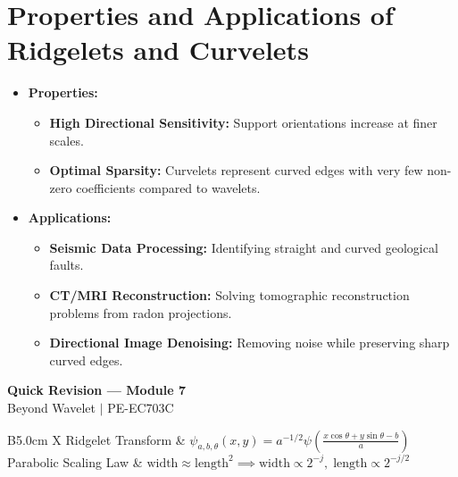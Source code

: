 \documentclass[12pt,a4paper]{article}
\renewcommand{\arraystretch}{1.45}
\begin{document}
\section{Properties and Applications of Ridgelets and Curvelets}

\begin{itemize}[leftmargin=*, itemsep=4.5pt]
  \item \textbf{Properties:} 
        \begin{itemize}[leftmargin=*, itemsep=2.5pt, topsep=2pt]
          \item \textbf{High Directional Sensitivity:} Support orientations increase at finer scales.
          \item \textbf{Optimal Sparsity:} Curvelets represent curved edges with very few non-zero coefficients compared to wavelets.
        \end{itemize}
  \item \textbf{Applications:}
        \begin{itemize}[leftmargin=*, itemsep=2.5pt, topsep=2pt]
          \item \textbf{Seismic Data Processing:} Identifying straight and curved geological faults.
          \item \textbf{CT/MRI Reconstruction:} Solving tomographic reconstruction problems from radon projections.
          \item \textbf{Directional Image Denoising:} Removing noise while preserving sharp curved edges.
        \end{itemize}
\end{itemize}

\newpage
\begin{center}
  {\large\bfseries\color{myred} Quick Revision --- Module 7}\\[3pt]
  {\small\color{mydark} Beyond Wavelet $|$ PE-EC703C}
\end{center}
\noindent{\color{myred}\rule{\linewidth}{1.2pt}}
\vspace{4pt}

\begin{tcolorbox}[formulabox, title={\textbf{Key Equations}}]
\renewcommand{\arraystretch}{1.35}
\begin{tabularx}{\linewidth}{B{5.0cm} X}
Ridgelet Transform & $\psi_{a,b,\theta}(x, y) = a^{-1/2} \psi\left(\frac{x \cos\theta + y \sin\theta - b}{a}\right)$ \\[12pt]
Parabolic Scaling Law & $\text{width} \approx \text{length}^2 \implies \text{width} \propto 2^{-j}, \; \text{length} \propto 2^{-j/2}$
\end{tabularx}
\end{tcolorbox}
\end{document}
